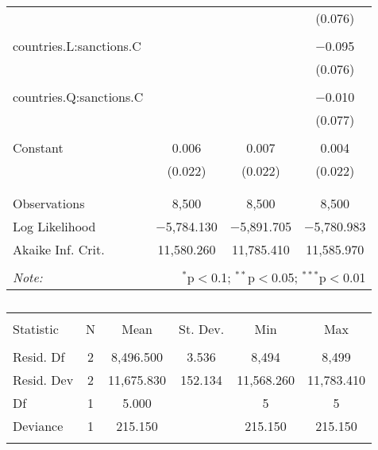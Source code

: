 \begin{table}[!htbp]
\begin{tabular}{@{\extracolsep{5pt}}lccc}
  &  &  & (0.076) \\ 
  & & & \\ 
 countries.L:sanctions.C &  &  & $-$0.095 \\ 
  &  &  & (0.076) \\ 
  & & & \\ 
 countries.Q:sanctions.C &  &  & $-$0.010 \\ 
  &  &  & (0.077) \\ 
  & & & \\ 
 Constant & 0.006 & 0.007 & 0.004 \\ 
  & (0.022) & (0.022) & (0.022) \\ 
  & & & \\ 
\hline \\[-1.8ex] 
Observations & 8,500 & 8,500 & 8,500 \\ 
Log Likelihood & $-$5,784.130 & $-$5,891.705 & $-$5,780.983 \\ 
Akaike Inf. Crit. & 11,580.260 & 11,785.410 & 11,585.970 \\ 
\hline 
\hline \\[-1.8ex] 
\textit{Note:}  & \multicolumn{3}{r}{$^{*}$p$<$0.1; $^{**}$p$<$0.05; $^{***}$p$<$0.01} \\ 
\end{tabular} 
\end{table} 

\begin{table}[!htbp] \centering 
  \caption{} 
  \label{tab:all} 
\begin{tabular}{@{\extracolsep{5pt}}lccccc} 
\\[-1.8ex]\hline 
\hline \\[-1.8ex] 
Statistic & \multicolumn{1}{c}{N} & \multicolumn{1}{c}{Mean} & \multicolumn{1}{c}{St. Dev.} & \multicolumn{1}{c}{Min} & \multicolumn{1}{c}{Max} \\ 
\hline \\[-1.8ex] 
Resid. Df & 2 & 8,496.500 & 3.536 & 8,494 & 8,499 \\ 
Resid. Dev & 2 & 11,675.830 & 152.134 & 11,568.260 & 11,783.410 \\ 
Df & 1 & 5.000 &  & 5 & 5 \\ 
Deviance & 1 & 215.150 &  & 215.150 & 215.150 \\ 
\hline \\[-1.8ex] 
\end{tabular} 
\end{table} 

